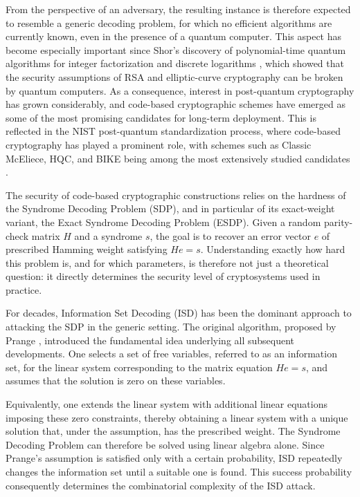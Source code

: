 \documentclass{amsart}
\begin{document}
From the perspective of an adversary, the resulting instance is therefore
expected to resemble a generic decoding problem, for which no efficient algorithms
are currently known, even in the presence of a quantum computer. This aspect
has become especially important since Shor's discovery of polynomial-time quantum
algorithms for integer factorization and discrete logarithms \cite{Shor}, which showed
that the security assumptions of RSA and elliptic-curve cryptography can be broken
by quantum computers. As a consequence, interest in post-quantum cryptography has grown
considerably, and code-based cryptographic schemes have emerged as some of the most
promising candidates for long-term deployment. This is reflected in the NIST
post-quantum standardization process, where code-based cryptography has played
a prominent role, with schemes such as Classic McEliece, HQC, and BIKE being
among the most extensively studied candidates \cite{PQC,ClassME,HQC,BIKE}.

The security of code-based cryptographic constructions relies on the
hardness of the Syndrome Decoding Problem (SDP), and in particular of its
exact-weight variant, the Exact Syndrome Decoding Problem (ESDP). Given a
random parity-check matrix $H$ and a syndrome $s$, the goal is to recover an
error vector $e$ of prescribed Hamming weight satisfying $H e = s$.
Understanding exactly how hard this problem is, and for which parameters,
is therefore not just a theoretical question: it directly determines the
security level of cryptosystems used in practice.

For decades, Information Set Decoding (ISD) has been the dominant
approach to attacking the SDP in the generic setting. The original algorithm,
proposed by Prange \cite{Pra}, introduced the fundamental idea underlying all
subsequent developments. One selects a set of free variables, referred to as an
information set, for the linear system corresponding to the matrix equation $H e = s$,
and assumes that the solution is zero on these variables.

Equivalently, one extends the linear system with additional linear equations
imposing these zero constraints, thereby obtaining a linear system with a unique
solution that, under the assumption, has the prescribed weight. The Syndrome Decoding
Problem can therefore be solved using linear algebra alone. Since Prange's assumption
is satisfied only with a certain probability, ISD repeatedly changes the information set
until a suitable one is found. This success probability consequently determines
the combinatorial complexity of the ISD attack.
\end{document}
